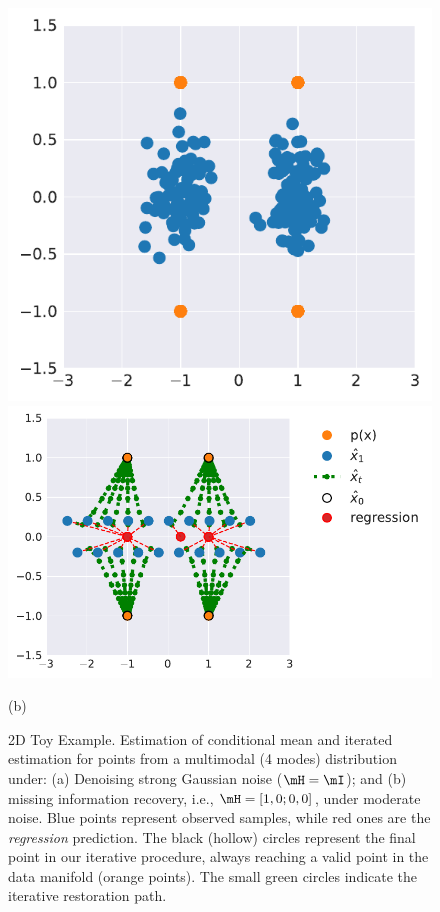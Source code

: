 \begin{figure}
\begin{minipage}[c]{.09\linewidth}
    \end{minipage}
    \begin{minipage}[c]{.445\linewidth}
    \centering
    \includegraphics[width=.49\linewidth,clip,trim=0 0 5 0]{./assets/toy_example_2d/2d_toyexample_H_px_py.pdf}
    \includegraphics[width=.49\linewidth, clip, trim=0 0 125 0]{./assets/toy_example_2d/2d_toyexample_H_estim_large_radius.pdf}
    
    (b) 
    \end{minipage}

    \caption{2D Toy Example. Estimation of conditional mean and iterated estimation for points from a multimodal (4 modes) distribution under: (a) Denoising strong Gaussian noise ($\mH = \mI$); and (b) missing information recovery, i.e., $\mH=[1, 0; 0, 0]$, under moderate noise. Blue points represent observed samples, while red ones are the \emph{regression} prediction. The black (hollow) circles represent the final point in our iterative procedure, always reaching a valid point in the data manifold (orange points). The small green circles indicate the iterative restoration path.}
    \label{fig:2d_toy_example}
\end{figure}